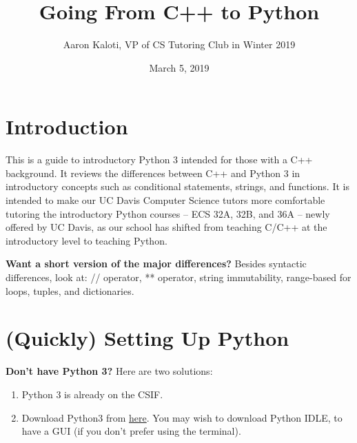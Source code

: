\documentclass{article}
\title{Going From C++ to Python}
\author{Aaron Kaloti, VP of CS Tutoring Club in Winter 2019}
\date{March 5, 2019}
\begin{document}
\maketitle
\tableofcontents

\section{Introduction}

This is a guide to introductory Python 3 intended for those with a C++ background. It reviews the differences between C++ and Python 3 in introductory concepts such as conditional statements, strings, and functions. It is intended to make our UC Davis Computer Science tutors more comfortable tutoring the introductory Python courses -- ECS 32A, 32B, and 36A -- newly offered by UC Davis, as our school has shifted from teaching C/C++ at the introductory level to teaching Python.

\textbf{Want a short version of the major differences?} Besides syntactic differences, look at: // operator, ** operator, string immutability, range-based for loops, tuples, and dictionaries.

\section{(Quickly) Setting Up Python}
\textbf{Don't have Python 3?} Here are two solutions:
\begin{enumerate}
    \item Python 3 is already on the CSIF.
    \item Download Python3 from \href{https://www.python.org/downloads/}{here}. You may wish to download Python IDLE, to have a GUI (if you don't prefer using the terminal). 
\end{enumerate}
\end{document}
